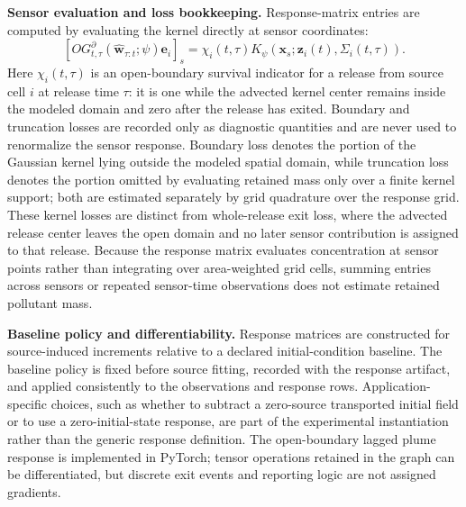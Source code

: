 \noindent\textbf{Sensor evaluation and loss bookkeeping.}
Response-matrix entries are computed by evaluating the kernel directly at
sensor coordinates:
\begin{equation}
\left[O G_{t,\tau}^{\partial}
(\widehat{\mathbf w}_{\tau:t};\psi)\mathbf e_i\right]_s
=\chi_i(t,\tau)K_\psi(\mathbf x_s;\mathbf z_i(t),\Sigma_i(t,\tau)).
\label{eq:sensor_response}
\end{equation}
Here \(\chi_i(t,\tau)\) is an open-boundary survival indicator for a release
from source cell \(i\) at release time \(\tau\): it is one while the advected
kernel center remains inside the modeled domain and zero after the release has
exited.  Boundary and truncation losses are recorded only as diagnostic
quantities and are never used to renormalize the sensor response.  Boundary
loss denotes the portion of the Gaussian kernel lying outside the modeled
spatial domain, while truncation loss denotes the portion omitted by evaluating
retained mass only over a finite kernel support; both are estimated separately
by grid quadrature over the response grid.  These kernel losses are distinct
from whole-release exit loss, where the advected release center leaves the open
domain and no later sensor contribution is assigned to that release.  Because
the response matrix evaluates concentration at sensor points rather than
integrating over area-weighted grid cells, summing entries across sensors or
repeated sensor-time observations does not estimate retained pollutant mass.

\noindent\textbf{Baseline policy and differentiability.}
Response matrices are constructed for source-induced increments relative to a
declared initial-condition baseline.  The baseline policy is fixed before
source fitting, recorded with the response artifact, and applied consistently to
the observations and response rows.  Application-specific choices, such as
whether to subtract a zero-source transported initial field or to use a
zero-initial-state response, are part of the experimental instantiation rather
than the generic response definition.  The open-boundary lagged plume response is
implemented in PyTorch; tensor operations retained in the graph can be
differentiated, but discrete exit events and reporting logic are not assigned
gradients.

